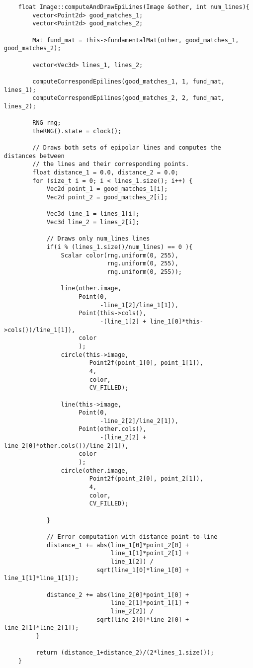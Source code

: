 \documentclass[a4paper, 11pt]{article}
\theoremstyle{definition}
\theoremstyle{theorem}
\begin{document}
    \begin{lstlisting}
    float Image::computeAndDrawEpiLines(Image &other, int num_lines){
        vector<Point2d> good_matches_1;
        vector<Point2d> good_matches_2;

        Mat fund_mat = this->fundamentalMat(other, good_matches_1, good_matches_2);

        vector<Vec3d> lines_1, lines_2;

        computeCorrespondEpilines(good_matches_1, 1, fund_mat, lines_1);
        computeCorrespondEpilines(good_matches_2, 2, fund_mat, lines_2);

        RNG rng;
        theRNG().state = clock();

        // Draws both sets of epipolar lines and computes the distances between
        // the lines and their corresponding points.
        float distance_1 = 0.0, distance_2 = 0.0;
        for (size_t i = 0; i < lines_1.size(); i++) {
            Vec2d point_1 = good_matches_1[i];
            Vec2d point_2 = good_matches_2[i];

            Vec3d line_1 = lines_1[i];
            Vec3d line_2 = lines_2[i];

            // Draws only num_lines lines
            if(i % (lines_1.size()/num_lines) == 0 ){
                Scalar color(rng.uniform(0, 255),
                             rng.uniform(0, 255),
                             rng.uniform(0, 255));

                line(other.image,
                     Point(0,
                           -line_1[2]/line_1[1]),
                     Point(this->cols(),
                           -(line_1[2] + line_1[0]*this->cols())/line_1[1]),
                     color
                     );
                circle(this->image,
                        Point2f(point_1[0], point_1[1]),
                        4,
                        color,
                        CV_FILLED);

                line(this->image,
                     Point(0,
                           -line_2[2]/line_2[1]),
                     Point(other.cols(),
                           -(line_2[2] + line_2[0]*other.cols())/line_2[1]),
                     color
                     );
                circle(other.image,
                        Point2f(point_2[0], point_2[1]),
                        4,
                        color,
                        CV_FILLED);

            }

            // Error computation with distance point-to-line
            distance_1 += abs(line_1[0]*point_2[0] +
                              line_1[1]*point_2[1] +
                              line_1[2]) /
                          sqrt(line_1[0]*line_1[0] + line_1[1]*line_1[1]);

            distance_2 += abs(line_2[0]*point_1[0] +
                              line_2[1]*point_1[1] +
                              line_2[2]) /
                          sqrt(line_2[0]*line_2[0] + line_2[1]*line_2[1]);
         }

         return (distance_1+distance_2)/(2*lines_1.size());
    }
    \end{lstlisting}
\end{document}
